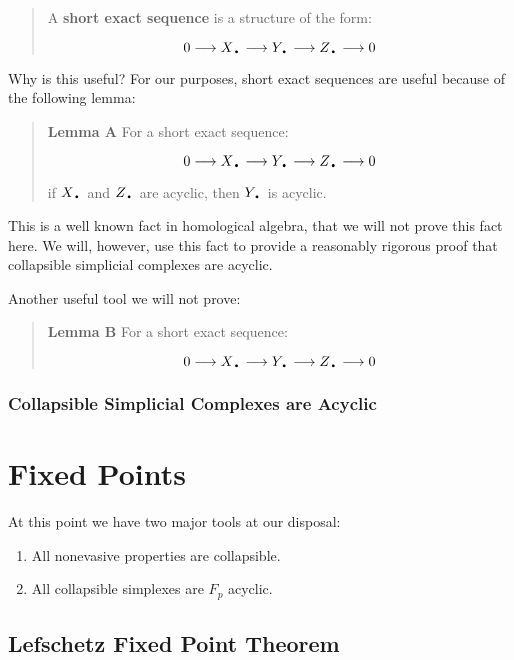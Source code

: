 \documentclass[letterpaper,12pt]{article}
\newcommand{\lra}{\longrightarrow}
\newcommand{\tb}{\text{\textbullet}}
\begin{document}
\begin{quote}
    A \textbf{short exact sequence} is a structure of the form:

    $$0 \lra X_{\tb} \lra Y_{\tb} \lra Z_{\tb} \lra 0 $$

\end{quote}

Why is this useful? For our purposes, short exact sequences are useful because of the following lemma:

\begin{quote}
    \textbf{Lemma A} For a short exact sequence:

    $$0 \lra X_{\tb} \lra Y_{\tb} \lra Z_{\tb} \lra 0 $$

    if $X_{\tb}$ and $Z_{\tb}$ are acyclic, then $Y_{\tb}$ is acyclic.
\end{quote}

This is a well known fact in homological algebra, that we will not prove this fact here. We will, however, use this fact to provide a reasonably rigorous proof that collapsible simplicial complexes are acyclic.


Another useful tool we will not prove:

\begin{quote}
    \textbf{Lemma B} For a short exact sequence:

    $$0 \lra X_{\tb} \lra Y_{\tb} \lra Z_{\tb} \lra 0 $$ 

\end{quote}

\subsubsection{Collapsible Simplicial Complexes are Acyclic}

\section{Fixed Points}

At this point we have two major tools at our disposal:

\begin{enumerate}
    \item{
            All nonevasive properties are collapsible.
        }
    \item{
            All collapsible simplexes are $F_p$ acyclic.
        }
\end{enumerate}


\subsection{Lefschetz Fixed Point Theorem}
\end{document}
